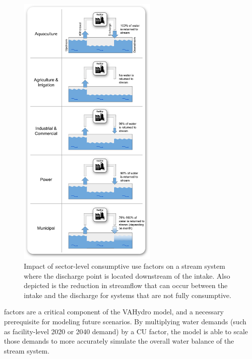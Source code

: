 \pagebreak


~\par\vspace{-\baselineskip} %

\begin{figure}
    \includegraphics[width=0.60\textwidth]{sections/Xfigures/CU_SectorFactor_Graphic.png}
    \caption{\small Impact of sector-level consumptive use factors on a stream system where the discharge point is located downstream of the intake. Also depicted is the reduction in streamflow that can occur between the intake and the discharge for systems that are not fully consumptive.}
    \label{fig:CU_SectorFactor_Graphic.png}
\end{figure}

\noindent factors are a critical component of the VAHydro model, and a necessary prerequisite for modeling future scenarios. By multiplying water demands (such as facility-level 2020 or 2040 demand) by a CU factor, the model is able to scale those demands to more accurately simulate the overall water balance of the stream system.\bigskip  

